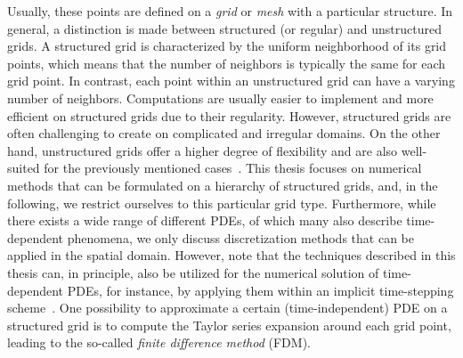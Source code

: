 Usually, these points are defined on a \emph{grid} or \emph{mesh} with a particular structure.
In general, a distinction is made between structured (or regular) and unstructured grids.
A structured grid is characterized by the uniform neighborhood of its grid points, which means that the number of neighbors is typically the same for each grid point.
In contrast, each point within an unstructured grid can have a varying number of neighbors.
Computations are usually easier to implement and more efficient on structured grids due to their regularity.
However, structured grids are often challenging to create on complicated and irregular domains.
On the other hand, unstructured grids offer a higher degree of flexibility and are also well-suited for the previously mentioned cases~\cite{knupp2020fundamentals}.
This thesis focuses on numerical methods that can be formulated on a hierarchy of structured grids, and, in the following, we restrict ourselves to this particular grid type.
Furthermore, while there exists a wide range of different PDEs, of which many also describe time-dependent phenomena, we only discuss discretization methods that can be applied in the spatial domain.
However, note that the techniques described in this thesis can, in principle, also be utilized for the numerical solution of time-dependent PDEs, for instance, by applying them within an implicit time-stepping scheme~\cite{ames2014numerical}.
One possibility to approximate a certain (time-independent) PDE on a structured grid is to compute the Taylor series expansion around each grid point, leading to the so-called \emph{finite difference method} (FDM).

